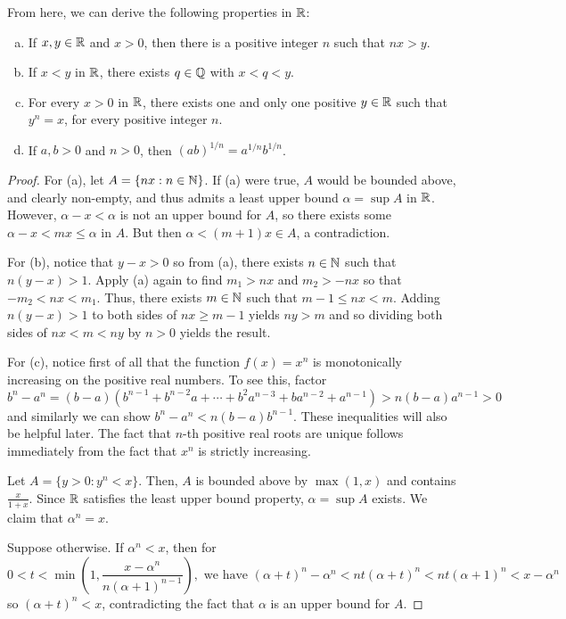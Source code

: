 \begin{theorem}
From here, we can derive the following properties in $\mathbb{R}$:
\begin{enumerate}[(a)]
\item If $x, y \in \mathbb{R}$ and $x > 0$, then there is a positive integer $n$ such that $nx > y$. 
\item If $x < y$ in $\mathbb{R}$, there exists $q \in \mathbb{Q}$ with $x < q < y$.
\item For every $x > 0$ in $\mathbb{R}$, there exists one and only one positive $y \in \mathbb{R}$ such that $y^n = x$, for every positive integer $n$.
\item If $a, b > 0$ and $n > 0$, then $(ab)^{1/n} = a^{1/n} b^{1/n}$.
\end{enumerate}
\begin{proof}
For (a), let $A = \{nx: n \in \mathbb{N}\}$. If (a) were true, $A$ would be bounded above, and clearly non-empty, and thus admits a least upper bound $\alpha = \sup A$ in $\mathbb{R}$. However, $\alpha - x < \alpha$ is not an upper bound for $A$, so there exists some $\alpha - x < mx \le \alpha$ in $A$. But then $\alpha < (m + 1)x \in A$, a contradiction.

For (b), notice that $y - x > 0$ so from (a), there exists $n \in \mathbb{N}$ such that $n(y - x) > 1$. Apply (a) again to find $m_1 > nx$ and $m_2 > -nx$ so that $-m_2 < nx < m_1$. Thus, there exists $m \in \mathbb{N}$ such that $m - 1 \le nx < m$. Adding $n(y - x) > 1$ to both sides of $nx \ge m - 1$ yields $ny > m$ and so dividing both sides of $nx < m < ny$ by $n > 0$ yields the result.

For (c), notice first of all that the function $f(x) = x^n$ is monotonically increasing on the positive real numbers. To see this, factor
\[
	b^n - a^n = (b - a)(b^{n-1} + b^{n-2}a + \dotsb + b^2 a^{n-3} + ba^{n-2} + a^{n-1}) > n(b-a)a^{n-1} > 0
\]
and similarly we can show $b^n - a^n < n(b-a)b^{n-1}$. These inequalities will also be helpful later. The fact that $n$-th positive real roots are unique follows immediately from the fact that $x^n$ is strictly increasing. 

Let $A = \{y > 0: y^n < x\}$. Then, $A$ is bounded above by $\max(1, x)$ and contains $\frac{x}{1+x}$. Since $\mathbb{R}$ satisfies the least upper bound property, $\alpha = \sup A$ exists. We claim that $\alpha^n = x$. 

Suppose otherwise. If $\alpha^n < x$, then for
\[
	0 < t < \min\left(1, \frac{x-\alpha^n}{n(\alpha + 1)^{n-1}}\right), \text{ we have }(\alpha + t)^n - \alpha^n < nt(\alpha + t)^n < nt(\alpha + 1)^n < x - \alpha^n
\]
so $(\alpha + t)^n < x$, contradicting the fact that $\alpha$ is an upper bound for $A$. 


\end{proof}
\end{theorem}

